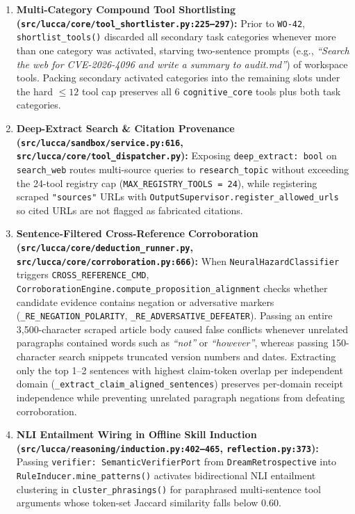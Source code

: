 \documentclass[11pt,a4paper]{article}
\begin{document}
\begin{enumerate}
    \item \textbf{Multi-Category Compound Tool Shortlisting (\texttt{src/lucca/core/tool\_shortlister.py:225--297}):} Prior to \texttt{WO-42}, \texttt{shortlist\_tools()} discarded all secondary task categories whenever more than one category was activated, starving two-sentence prompts (e.g., \emph{``Search the web for CVE-2026-4096 and write a summary to audit.md''}) of workspace tools. Packing secondary activated categories into the remaining slots under the hard $\le 12$ tool cap preserves all 6 \texttt{cognitive\_core} tools plus both task categories.
    \item \textbf{Deep-Extract Search \& Citation Provenance (\texttt{src/lucca/sandbox/service.py:616}, \texttt{src/lucca/core/tool\_dispatcher.py}):} Exposing \texttt{deep\_extract: bool} on \texttt{search\_web} routes multi-source queries to \texttt{research\_topic} without exceeding the 24-tool registry cap (\texttt{MAX\_REGISTRY\_TOOLS = 24}), while registering scraped \texttt{"sources"} URLs with \texttt{OutputSupervisor.register\_allowed\_urls} so cited URLs are not flagged as fabricated citations.
    \item \textbf{Sentence-Filtered Cross-Reference Corroboration (\texttt{src/lucca/core/deduction\_runner.py}, \texttt{src/lucca/core/corroboration.py:666}):} When \texttt{NeuralHazardClassifier} triggers \texttt{CROSS\_REFERENCE\_CMD}, \texttt{CorroborationEngine.compute\_proposition\_alignment} checks whether candidate evidence contains negation or adversative markers (\texttt{\_RE\_NEGATION\_POLARITY}, \texttt{\_RE\_ADVERSATIVE\_DEFEATER}). Passing an entire 3,500-character scraped article body caused false conflicts whenever unrelated paragraphs contained words such as \emph{``not''} or \emph{``however''}, whereas passing 150-character search snippets truncated version numbers and dates. Extracting only the top 1--2 sentences with highest claim-token overlap per independent domain (\texttt{\_extract\_claim\_aligned\_sentences}) preserves per-domain receipt independence while preventing unrelated paragraph negations from defeating corroboration.
    \item \textbf{NLI Entailment Wiring in Offline Skill Induction (\texttt{src/lucca/reasoning/induction.py:402--465}, \texttt{reflection.py:373}):} Passing \texttt{verifier: SemanticVerifierPort} from \texttt{DreamRetrospective} into \texttt{RuleInducer.mine\_patterns()} activates bidirectional NLI entailment clustering in \texttt{cluster\_phrasings()} for paraphrased multi-sentence tool arguments whose token-set Jaccard similarity falls below $0.60$.
\end{enumerate}
\end{document}
